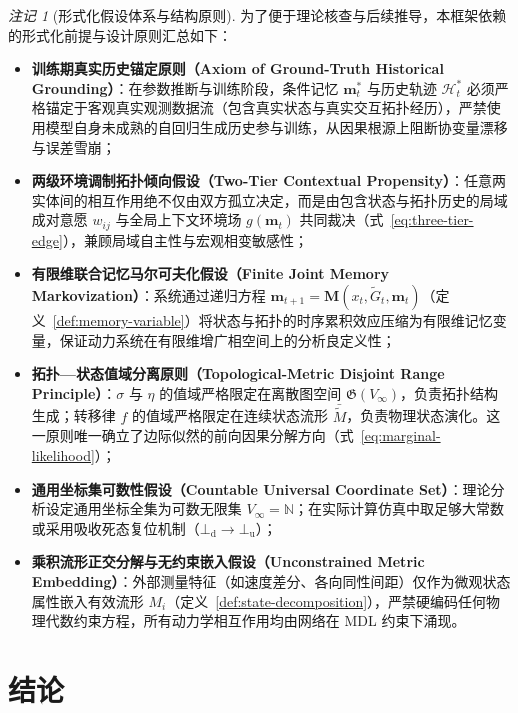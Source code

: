 \documentclass[11pt,a4paper]{article}
\numberwithin{equation}{section}
\theoremstyle{definition}
\theoremstyle{remark}
\newtheorem{remark}[definition]{注记}
\begin{document}
	\begin{remark}[形式化假设体系与结构原则]\label{rem:boundary}
		为了便于理论核查与后续推导，本框架依赖的形式化前提与设计原则汇总如下：
		\begin{itemize}[leftmargin=2em]
			\item \textbf{训练期真实历史锚定原则（Axiom of Ground-Truth Historical Grounding）}：在参数推断与训练阶段，条件记忆 $\mathbf{m}_t^\ast$ 与历史轨迹 $\mathcal{H}_t^\ast$ 必须严格锚定于客观真实观测数据流（包含真实状态与真实交互拓扑经历），严禁使用模型自身未成熟的自回归生成历史参与训练，从因果根源上阻断协变量漂移与误差雪崩；
			\item \textbf{两级环境调制拓扑倾向假设（Two-Tier Contextual Propensity）}：任意两实体间的相互作用绝不仅由双方孤立决定，而是由包含状态与拓扑历史的局域成对意愿 $w_{ij}$ 与全局上下文环境场 $g(\mathbf{m}_t)$ 共同裁决（式~\eqref{eq:three-tier-edge}），兼顾局域自主性与宏观相变敏感性；
			\item \textbf{有限维联合记忆马尔可夫化假设（Finite Joint Memory Markovization）}：系统通过递归方程 $\mathbf{m}_{t+1} = \mathbf{M}(x_t, \widetilde{G}_t, \mathbf{m}_t)$（定义~\ref{def:memory-variable}）将状态与拓扑的时序累积效应压缩为有限维记忆变量，保证动力系统在有限维增广相空间上的分析良定义性；
			\item \textbf{拓扑—状态值域分离原则（Topological-Metric Disjoint Range Principle）}：$\sigma$ 与 $\eta$ 的值域严格限定在离散图空间 $\mathfrak{G}(V_\infty)$，负责拓扑结构生成；转移律 $f$ 的值域严格限定在连续状态流形 $\bar{\widetilde{M}}$，负责物理状态演化。这一原则唯一确立了边际似然的前向因果分解方向（式~\eqref{eq:marginal-likelihood}）；
			\item \textbf{通用坐标集可数性假设（Countable Universal Coordinate Set）}：理论分析设定通用坐标全集为可数无限集 $V_\infty = \mathbb{N}$；在实际计算仿真中取足够大常数或采用吸收死态复位机制（$\bot_{\mathrm{d}}\to\bot_{\mathrm{u}}$）；
			\item \textbf{乘积流形正交分解与无约束嵌入假设（Unconstrained Metric Embedding）}：外部测量特征（如速度差分、各向同性间距）仅作为微观状态属性嵌入有效流形 $M_i$（定义~\ref{def:state-decomposition}），严禁硬编码任何物理代数约束方程，所有动力学相互作用均由网络在 MDL 约束下涌现。
		\end{itemize}
	\end{remark}
	
	\section{结论}\label{sec:conclusion}
	
\end{document}
